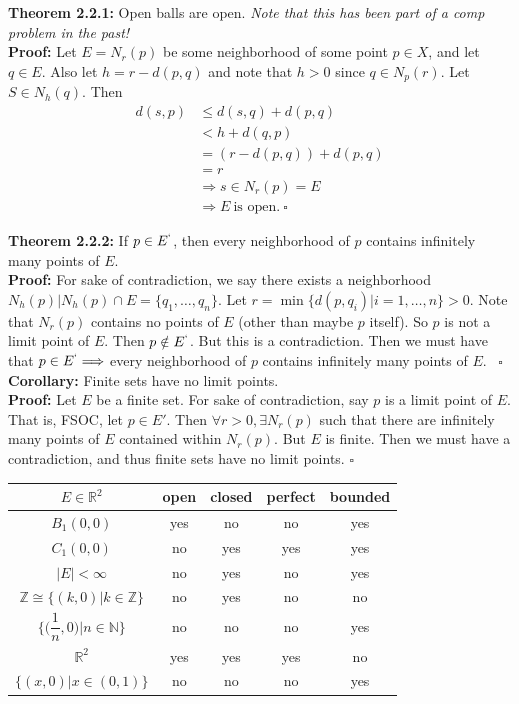 \documentclass{article}
\newcommand{\Divides}{\mathbin{\big|}}
\begin{document}
\textbf{Theorem 2.2.1:} Open balls are open. \textit{Note that this has been part of a comp problem in the past!}\\
\textbf{Proof:} Let $E = N_r(p)$ be some neighborhood of some point $p \in X$, and let $q \in E$. Also let $h = r-d(p,q)$ and note that $h > 0$ since $q \in N_p(r)$. Let $S \in N_h(q)$. Then 
\begin{align*}
    d(s,p) & \leq d(s,q) + d(p,q)\\
    & < h + d(q,p)\\
    &= (r-d(p,q))+d(p,q)\\
    &=r\\
    &\Longrightarrow s \in N_r(p) = E\\
    &\Longrightarrow E \ \text{is open.} \ \square
\end{align*}

\textbf{Theorem 2.2.2:} If $p \in E^`$, then every neighborhood of $p$ contains infinitely many points of $E$.\\
\textbf{Proof:} For sake of contradiction, we say there exists a neighborhood \\ $N_h(p) \Divides N_h(p) \cap E = \{q_1, \dots , q_n\}$. Let $r=\min\{d(p,q_i) \Divides i = 1, \dots, n\} > 0$. Note that $N_r(p)$ contains no points of $E$ (other than maybe $p$ itself). So $p$ is not a limit point of $E$. Then $ p \notin E^`$. But this is a contradiction. Then we must have that $p \in E^` \Longrightarrow $ every neighborhood of $p$ contains infinitely many points of $E$. \ $\square$\\

\textbf{Corollary:} Finite sets have no limit points.\\

\textbf{Proof:} Let $E$ be a finite set. For sake of contradiction, say $p$ is a limit point of $E$. That is, FSOC, let $p \in E'$. Then $\forall r > 0, \exists N_r(p)$ such that there are infinitely many points of $E$ contained within $N_r(p)$. But $E$ is finite. Then we must have a contradiction, and thus finite sets have no limit points. $\square$

\begin{center}
\begin{tabular}{ |c|c|c|c|c| }
\hline
 $E \in \mathbb{R}^2$ & open & closed & perfect & bounded \\
 \hline
 $B_1(0,0)$ & yes & no & no & yes \\
 \hline
 $C_1(0,0)$ & no & yes & yes & yes \\
 \hline
 $|E| < \infty$ & no & yes & no & yes \\
 \hline
 $\mathbb{Z} \cong \{(k,0) \big| k \in \mathbb{Z}\}$ & no & yes & no & no \\
 \hline
 $\biggl\{ \biggl( \dfrac{1}{n} , 0 \biggr) \bigg|  n \in \mathbb{N} \biggr\}$ & no & no & no & yes \\
 \hline
 $\mathbb{R}^2$ & yes & yes & yes & no \\
 \hline
 $\{(x,0) \big| x \in (0,1)\}$ & no & no & no & yes\\
 \hline
\end{tabular}
\end{center}
\end{document}
